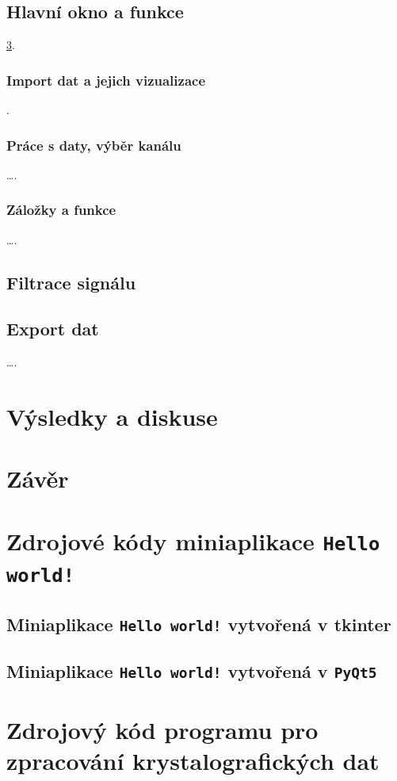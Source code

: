 \documentclass[a4paper, 12pt]{article}
\begin{document}
\subsection{Hlavní okno a funkce}
\ref{PrilohaA}.
\subsubsection{Import dat a jejich vizualizace}
\cite{petz08}.
\subsubsection{Práce s daty, výběr kanálu}
\ldots .
\subsubsection{Záložky a funkce}
\ldots .

\subsection{Filtrace signálu}\label{sec:exp_filtrace}

\subsection{Export dat}
\ldots .

\newpage
\section{Výsledky a diskuse}

\newpage
\section{Závěr}


\newpage
{}




\newpage

\appendix
%
\section{Zdrojové kódy miniaplikace \texttt{Hello world!}}
\label{PrilohaA}
\subsection{Miniaplikace \texttt{Hello world!} vytvořená v tkinter}


\subsection{Miniaplikace \texttt{Hello world!} vytvořená v \texttt{PyQt5}}

%
\section{Zdrojový kód programu pro zpracování krystalografických dat}
\label{PrilohaB}

\end{document}
